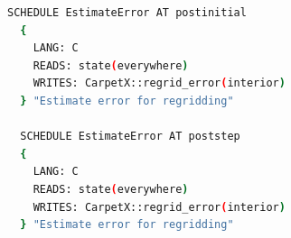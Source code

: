 \begin{lstlisting}[language=bash]
  SCHEDULE EstimateError AT postinitial
  {
    LANG: C
    READS: state(everywhere)
    WRITES: CarpetX::regrid_error(interior)
  } "Estimate error for regridding"
  
  SCHEDULE EstimateError AT poststep
  {
    LANG: C
    READS: state(everywhere)
    WRITES: CarpetX::regrid_error(interior)
  } "Estimate error for regridding"
\end{lstlisting}
